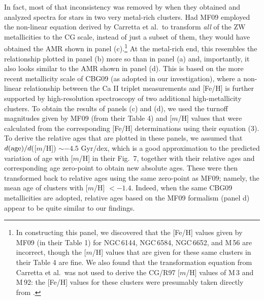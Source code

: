\documentclass[12pt,preprint]{aastex}
\begin{document}
In fact, most of that inconsistency was removed by \citet{ccg01} when they
obtained and analyzed spectra for stars in two very metal-rich clusters.  Had
MF09 employed the non-linear equation derived by Carretta et al.~to transform
{\it all} of the ZW metallicities to the CG scale, instead of just a subset of
them, they would have obtained the AMR shown in panel (c).\footnote{In
constructing this panel, we discovered that the [Fe/H] values given by MF09 (in
their Table 1) for NGC$\,$6144, NGC$\,$6584, NGC$\,$6652, and M$\,$56 are
incorrect, though the [$m$/H] values that are given for these same clusters in
their Table 4 are fine.  We also found that the transformation equation from
Carretta et al.~was not used to derive the CG/R97 [$m$/H] values of M$\,$3
and M$\,$92: the [Fe/H] values for these clusters were presumably taken
directly from \citet{cg97}.}  At the metal-rich end, this resembles the 
relationship plotted in panel (b) more so than in panel (a) and, importantly,
it also looks similar to the AMR shown in panel (d).  This is based on the more
recent metallicity scale of CBG09 (as adopted in our investigation), where a
non-linear relationship between the Ca II triplet measurements and [Fe/H] is
further supported by high-resolution spectroscopy of two additional
high-metallicity clusters.  To obtain the results of panels (c) and (d), we
used the turnoff magnitudes given by MF09 (from their Table 4) and [$m$/H]
values that were calculated from the corresponding [Fe/H] determinations using
their equation (3).  To derive the relative ages that are plotted in these
panels, we assumed that $d({\rm age})/d($[$m$/H]) $\sim -4.5$ Gyr/dex, which is
a good approximation to the predicted variation of age with [$m$/H] in their
Fig.~7, together with their relative ages and corresponding age zero-point to
obtain new absolute ages.  These were then transformed back to relative ages
using the same zero-point as MF09; namely, the mean age of clusters with [$m$/H]
$< -1.4$.  Indeed, when the same CBG09 metallicities are adopted, relative ages
based on the MF09 formalism (panel d) appear to be quite similar to our findings.
\end{document}

